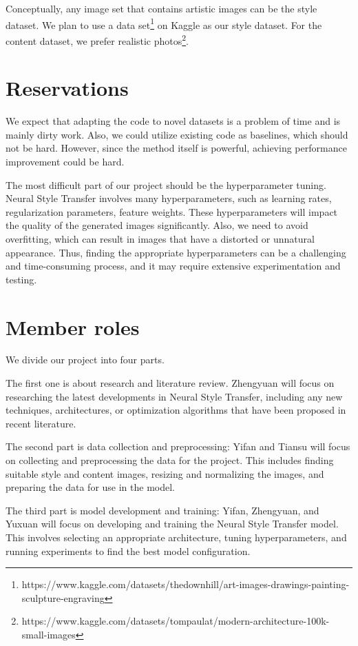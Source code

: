 \documentclass[10pt,twocolumn,letterpaper]{article}
\begin{document}
Conceptually, any image set that contains artistic images can be the style dataset.
We plan to use a data set\footnote{https://www.kaggle.com/datasets/thedownhill/art-images-drawings-painting-sculpture-engraving} on Kaggle as our style dataset. For the content dataset, we prefer realistic photos\footnote{https://www.kaggle.com/datasets/tompaulat/modern-architecture-100k-small-images}.
\section{Reservations}
We expect that adapting the code to novel datasets is a problem of time and is mainly dirty work. Also, we could utilize existing code as baselines, which should not be hard. However, since the method itself is powerful, achieving performance improvement could be hard. 

The most difficult part of our project should be the hyperparameter tuning. Neural Style Transfer involves many hyperparameters, such as learning rates, regularization parameters, feature weights. These hyperparameters will impact the quality of the generated images significantly. Also, we need to avoid overfitting, which can result in images that have a distorted or unnatural appearance. Thus, finding the appropriate hyperparameters can be a challenging and time-consuming process, and it may require extensive experimentation and testing.

\section{Member roles}
\label{sec:intro}

We divide our project into four parts.

The first one is about research and literature review. Zhengyuan will focus on researching the latest developments in Neural Style Transfer, including any new techniques, architectures, or optimization algorithms that have been proposed in recent literature. 

The second part is data collection and preprocessing: Yifan and Tiansu will focus on collecting and preprocessing the data for the project. This includes finding suitable style and content images, resizing and normalizing the images, and preparing the data for use in the model.

The third part is model development and training: Yifan, Zhengyuan, and Yuxuan will focus on developing and training the Neural Style Transfer model. This involves selecting an appropriate architecture, tuning hyperparameters, and running experiments to find the best model configuration.
\end{document}
